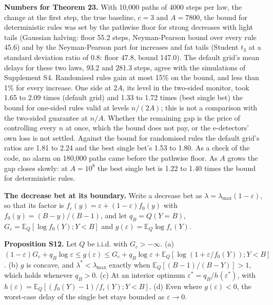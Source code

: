 \documentclass[
]{article}
\begin{document}
\textbf{Numbers for Theorem 23.} With 10,000 paths of 4000 steps per
law, the change at the first step, the true baseline, \(c = 3\) and
\(A = 7800\), the bound for deterministic rules was set by the pathwise
floor for strong decreases with light tails (Gaussian halving: floor
55.2 steps, Neyman-Pearson bound over every rule 45.6) and by the
Neyman-Pearson part for increases and fat tails (Student \(t_3\) at a
standard deviation ratio of 0.8: floor 47.8, bound 147.0). The default
grid's mean delays for these two laws, 93.2 and 281.3 steps, agree with
the simulations of Supplement S4. Randomised rules gain at most 15\% on
the bound, and less than 1\% for every increase. One side at \(2A\), its
level in the two-sided monitor, took 1.65 to 2.09 times (default grid)
and 1.33 to 1.72 times (best single bet) the bound for one-sided rules
valid at levels \(n/(2A)\); this is not a comparison with the two-sided
guarantee at \(n/A\). Whether the remaining gap is the price of
controlling every \(n\) at once, which the bound does not pay, or the
e-detectors' own loss is not settled. Against the bound for randomised
rules the default grid's ratios are 1.81 to 2.24 and the best single
bet's 1.53 to 1.80. As a check of the code, no alarm on 180,000 paths
came before the pathwise floor. As \(A\) grows the gap closes slowly: at
\(A = 10^8\) the best single bet is 1.22 to 1.40 times the bound for
deterministic rules.

\textbf{The decrease bet at its boundary.} Write a decrease bet as
\(\lambda = \lambda_{\max}(1 - \varepsilon)\), so that its factor is
\(f_\varepsilon(y) = \varepsilon + (1 - \varepsilon)f_0(y)\) with
\(f_0(y) = (B - y)/(B - 1)\), and let \(q_B = Q(Y = B)\),
\(G_c = \mathbb{E}_Q[\log f_0(Y); Y < B]\) and
\(g(\varepsilon) = \mathbb{E}_Q\log f_\varepsilon(Y)\).

\textbf{Proposition S12.} Let \(Q\) be i.i.d. with \(G_c > -\infty\).
(a)
\((1 - \varepsilon)G_c + q_B\log\varepsilon \le g(\varepsilon) \le G_c + q_B\log\varepsilon + \mathbb{E}_Q[\log(1 + \varepsilon/f_0(Y)); Y < B]\).
(b) \(g\) is concave, and \(\lambda^\ast < \lambda_{\max}\) exactly when
\(\mathbb{E}_Q[(B-1)/(B-Y)] > 1\), which holds whenever \(q_B > 0\). (c)
At an interior optimum \(\varepsilon^\ast = q_B/h(\varepsilon^\ast)\),
with
\(h(\varepsilon) = \mathbb{E}_Q[(f_0(Y) - 1)/f_\varepsilon(Y); Y < B]\).
(d) Even where \(g(\varepsilon) < 0\), the worst-case delay of the
single bet stays bounded as \(\varepsilon \to 0\).
\end{document}

